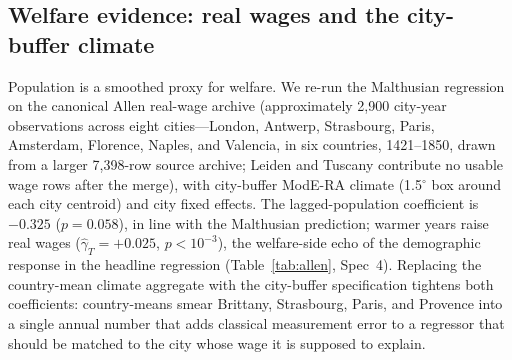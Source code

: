 \documentclass[11pt,letterpaper]{article}
\begin{document}
\subsection{Welfare evidence: real wages and the city-buffer climate}
\label{sec:allen}

Population is a smoothed proxy for welfare. We re-run the Malthusian regression on the canonical Allen real-wage archive (approximately 2{,}900 city-year observations across eight cities---London, Antwerp, Strasbourg, Paris, Amsterdam, Florence, Naples, and Valencia, in six countries, 1421--1850, drawn from a larger 7{,}398-row source archive; Leiden and Tuscany contribute no usable wage rows after the merge), with city-buffer ModE-RA climate (1.5$^\circ$ box around each city centroid) and city fixed effects. The lagged-population coefficient is $-0.325$ ($p=0.058$), in line with the Malthusian prediction; warmer years raise real wages ($\hat\gamma_T = +0.025$, $p<10^{-3}$), the welfare-side echo of the demographic response in the headline regression (Table~\ref{tab:allen}, Spec~4). Replacing the country-mean climate aggregate with the city-buffer specification tightens both coefficients: country-means smear Brittany, Strasbourg, Paris, and Provence into a single annual number that adds classical measurement error to a regressor that should be matched to the city whose wage it is supposed to explain.
\end{document}
